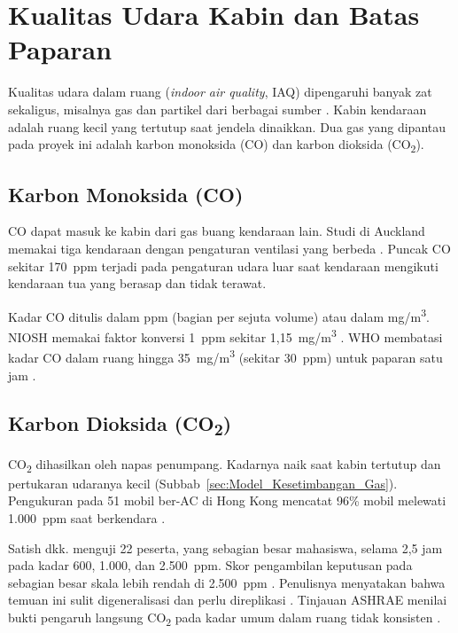 \section{Kualitas Udara Kabin dan Batas Paparan}
\label{sec:Kualitas_Udara_Kabin}

    Kualitas udara dalam ruang (\textit{indoor air quality}, IAQ) dipengaruhi banyak zat sekaligus, misalnya gas dan partikel dari berbagai sumber \cite{ashrae_co2}. Kabin kendaraan adalah ruang kecil yang tertutup saat jendela dinaikkan. Dua gas yang dipantau pada proyek ini adalah karbon monoksida (CO) dan karbon dioksida (CO\textsubscript{2}).

    \subsection{Karbon Monoksida (CO)}

    CO dapat masuk ke kabin dari gas buang kendaraan lain. Studi di Auckland memakai tiga kendaraan dengan pengaturan ventilasi yang berbeda \cite{dirks2018}. Puncak CO sekitar 170~ppm terjadi pada pengaturan udara luar saat kendaraan mengikuti kendaraan tua yang berasap dan tidak terawat.

    Kadar CO ditulis dalam ppm (bagian per sejuta volume) atau dalam mg/m\textsuperscript{3}. NIOSH memakai faktor konversi 1~ppm sekitar 1,15~mg/m\textsuperscript{3} \cite{niosh_co}. WHO membatasi kadar CO dalam ruang hingga 35~mg/m\textsuperscript{3} (sekitar 30~ppm) untuk paparan satu jam \cite{who_iaq}.

    \subsection{Karbon Dioksida (CO\texorpdfstring{\textsubscript{2}}{2})}

    CO\textsubscript{2} dihasilkan oleh napas penumpang. Kadarnya naik saat kabin tertutup dan pertukaran udaranya kecil (Subbab~\ref{sec:Model_Kesetimbangan_Gas}). Pengukuran pada 51 mobil ber-AC di Hong Kong mencatat 96\% mobil melewati 1.000~ppm saat berkendara \cite{barnes2018}.

    Satish dkk. menguji 22 peserta, yang sebagian besar mahasiswa, selama 2,5 jam pada kadar 600, 1.000, dan 2.500~ppm. Skor pengambilan keputusan pada sebagian besar skala lebih rendah di 2.500~ppm \cite{satish2012}. Penulisnya menyatakan bahwa temuan ini sulit digeneralisasi dan perlu direplikasi \cite{satish2012}. Tinjauan ASHRAE menilai bukti pengaruh langsung CO\textsubscript{2} pada kadar umum dalam ruang tidak konsisten \cite{ashrae_co2}.

